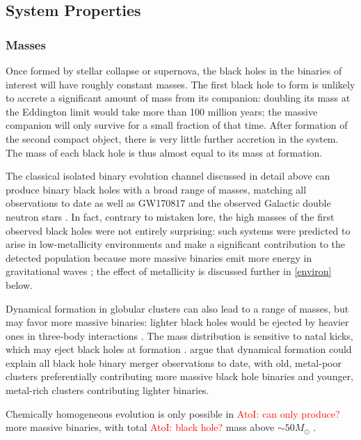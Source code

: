 \documentclass[iop,onecolumn]{revtex4}
\newcommand{\ajf}[1]{\textcolor{red}{AtoI: #1}}
\begin{document}
\subsection{System Properties}
\subsubsection{Masses}
Once formed by stellar collapse or supernova, the black holes in the binaries of interest will have roughly constant masses. The first black hole to form is unlikely to accrete a significant amount of mass from its companion: doubling its mass at the Eddington limit would take more than 100 million years; the massive companion will only survive for a small fraction of that time. After formation of the second compact object, there is very little further accretion in the system. The mass of each black hole is thus almost equal to its mass at formation. 

The classical isolated binary evolution channel discussed in detail above can produce binary black holes with a broad range of masses, matching all observations to date \citep[e.g.,][]{Stevenson:2017} as well as GW170817 and the observed Galactic double neutron stars \citep[e.g.,][]{Kruckow:2018,VignaGomez:2018}.  In fact, contrary to mistaken lore, the high masses of the first observed black holes were not entirely surprising: such systems were predicted to arise in low-metallicity environments and make a significant contribution to the detected population because more massive binaries emit more energy in gravitational waves \citep{Dominik:2014}; the effect of metallicity is discussed further in \autoref{environ} below. 

 Dynamical formation in globular clusters can also lead to a range of masses, but may favor more massive binaries: lighter black holes would be ejected by heavier ones in three-body interactions \citep{Rodriguez:2015}. The mass distribution is sensitive to natal kicks, which may eject black holes at formation \citep{Zevin:2017}.  \citet{Chatterjee:2017} argue that dynamical formation could explain all black hole binary merger observations to date, with old, metal-poor clusters preferentially contributing more massive black hole binaries and younger, metal-rich clusters contributing lighter binaries.
 
  Chemically homogeneous evolution is only possible in \ajf{can only produce?} more massive binaries, with total \ajf{black hole?} mass above $\sim 50 M_\odot$ \citep{MandeldeMink:2016,Marchant:2016}.
\end{document}
